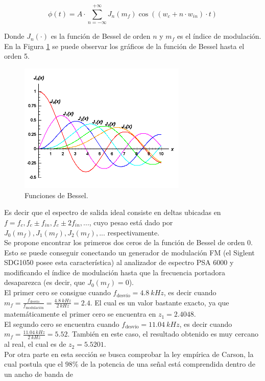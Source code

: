 \documentclass[a4paper,10pt]{article}
\begin{document}
		$$\phi(t)=A\cdot\sum_{n=-\infty}^{+\infty}J_n(m_f)\cos((w_c+n\cdot 
		w_{in})\cdot t)$$
		
		\indent Donde $J_n(\cdot)$ es la funci\'on de Bessel de orden $n$ y 
		$m_f$ es el \'indice de modulaci\'on. En la Figura \ref{bessel} se puede
		observar los gr\'aficos de la funci\'on de Bessel hasta el orden 5.
		
		\begin{figure}[!htb]
				\centering
				\includegraphics[width=8cm]
				{Imagenes/bessel.png}
				\caption{Funciones de Bessel.}
				\label{bessel} 
		\end{figure}
		
		\indent Es decir que el espectro de salida ideal consiste en deltas 
		ubicadas en $f=f_c,f_c\pm f_{in},f_c\pm 2f_{in},...$, cuyo pesao 
		est\'a dado por $J_0(m_f),J_1(m_f),J_2(m_f),...$ respectivamente. \\
		\indent Se propone encontrar los primeros dos ceros de la funci\'on de 
		Bessel de orden 0. Esto se puede conseguir conectando un generador de 
		modulaci\'on FM (el Siglent SDG1050 posee esta caracter\'istica) al 
		analizador de espectro PSA 6000 y modificando el \'indice de 
		modulaci\'on hasta que la frecuencia portadora desaparezca (es decir, 
		que $J_0(m_f)=0$). \\
		\indent El primer cero se consigue cuando $f_{\mbox{desv\'io}}=4.8~kHz$,
		es decir cuando $m_f=\frac{f_{\mbox{desv\'io}}}{f_{\mbox{modulaci\'on}}}
		=\frac{4.8~kHz}{2~kHz}=2.4$. El cual es un valor bastante exacto, ya que
		matem\'aticamente el primer cero se encuentra en $z_1=2.4048$. \\
		\indent El segundo cero se encuentra cuando $f_{\mbox{desv\'io}}=11.04~
		kHz$, es decir cuando $m_f=\frac{11.04~kHz}{2~kHz}=5.52$. Tambi\'en en 
		este caso, el resultado obtenido es muy cercano al real, el cual es de 
		$z_2=5.5201$. \\
		\indent Por otra parte en esta secci\'on se busca comprobar la ley 
		emp\'irica de Carson, la cual postula que el $98\%$ de la potencia de 
		una se\~nal est\'a comprendida dentro de un ancho de banda de
\end{document}

